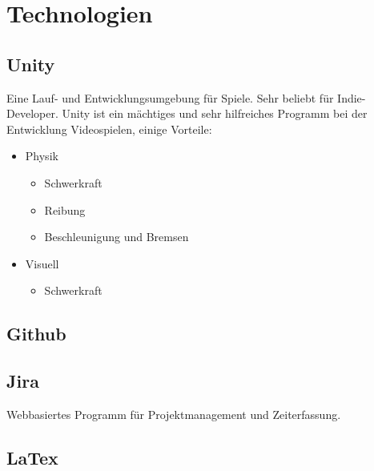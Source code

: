 \chapter{Technologien}

\section{Unity}
Eine Lauf- und Entwicklungsumgebung für Spiele.
Sehr beliebt für Indie-Developer.
Unity ist ein mächtiges und sehr hilfreiches Programm bei der Entwicklung Videospielen, einige Vorteile:
\begin{itemize}
    \item Physik
    \begin{itemize}
        \item Schwerkraft
        \item Reibung
        \item Beschleunigung und Bremsen
    \end{itemize}
    \item Visuell
    \begin{itemize}
        \item Schwerkraft
    \end{itemize}
\end{itemize}

\section{Github}

\section{Jira}
Webbasiertes Programm für Projektmanagement und Zeiterfassung.

\section{LaTex}


